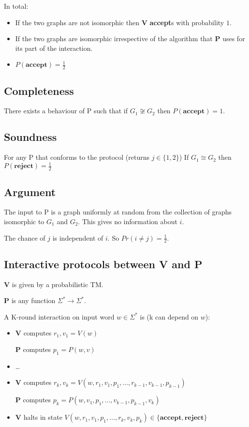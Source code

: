 \documentclass[a4paper,12pt]{article}
\theoremstyle{definition}
\theoremstyle{remark}
\begin{document}
In total:
\begin{itemize}
    \item If the two graphs are not isomorphic then \textbf{V} \textbf{accept}s with probability $1$.
    \item If the two graphs are isomorphic irrespective of the algorithm that \textbf{P} uses for its part of the interaction.
    \item $P(\textbf{accept}) = \frac{1}{2}$
\end{itemize}

\subsection*{Completeness}
There exists a behaviour of P such that if $G_1 \not \cong G_2$ then $P(\textbf{accept}) = 1$.

\subsection*{Soundness}
For any P that conforms to the protocol (returns $j \in \{1, 2\}$)
If $G_1 \cong G_2$ then $P(\textbf{reject}) = \frac{1}{2}$

\subsection*{Argument}
The input to P is a graph uniformly at random from the collection of graphs isomorphic to $G_1$ and $G_2$.
This gives no information about $i$.

The chance of $j$ is independent of $i$. So $Pr(i \neq j) = \frac{1}{2}$.

\subsection{Interactive protocols between \textbf{V} and \textbf{P}}
\textbf{V} is given by a probabilistic TM.

\textbf{P} is any function $\Sigma^* \to \Sigma^*$.

A K-round interaction on input word $w \in \Sigma^*$ is (k can depend on $w$):

\begin{itemize}
    \item \textbf{V} computes $r_1, v_1 = V(w)$
    
    \textbf{P} computes $p_1 = P(w, v)$

    \item \dots
    
    \item \textbf{V} computes $r_k, v_k = V(w, r_1, v_1, p_1, \dots, r_{k-1}, v_{k-1}, p_{k-1})$
    
    \textbf{P} computes $p_k = P(w, v_1, p_1, \dots, v_{k-1}, p_{k-1}, v_k)$

    \item \textbf{V} halts in state $V(w, r_1, v_1, p_1, \dots, r_k, v_k, p_k) \in \{\textbf{accept}, \textbf{reject}\}$
\end{itemize}
\end{document}
